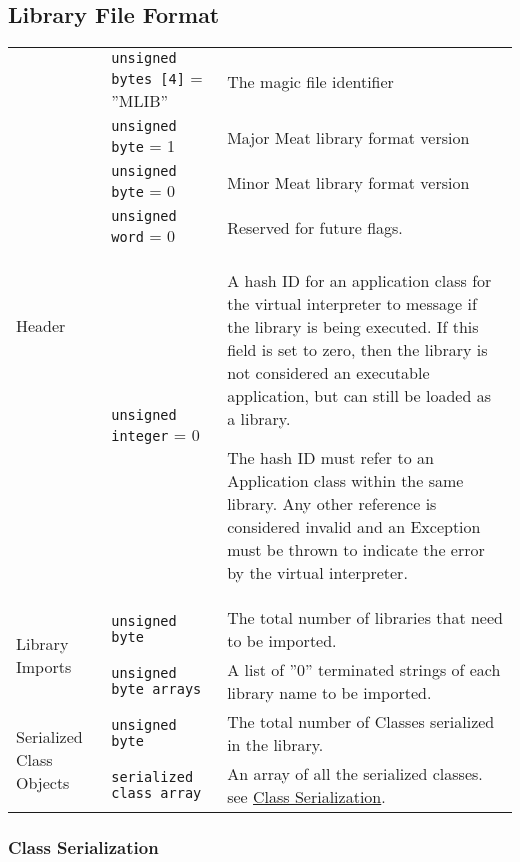 \subsection{Library File Format}

\begin{center}
  \begin{tabular}{ |l|l|p{8cm}| }
    \hline
    \multirow{5}{*}{Header} & \texttt{unsigned bytes [4]} = ''MLIB'' & The
    magic file identifier\\ \cline{2-3}
    & \texttt{unsigned byte} = 1 & Major Meat library format version\\
    \cline{2-3}
    & \texttt{unsigned byte} = 0 & Minor Meat library format version\\
    \cline{2-3}
    & \texttt{unsigned word} = 0 & Reserved for future flags.\\ \cline{2-3}
    & \texttt{unsigned integer} = 0 & A hash ID for an application class for
    the virtual interpreter to message if the library is being executed.
    If this field is set to zero, then the library is not considered an
    executable application, but can still be loaded as a library.

    The hash ID must refer to an Application class within the same library.
    Any other reference is considered invalid and an Exception must be
    thrown to indicate the error by the virtual interpreter.\\
    \hline

    \multirow{2}{*}{Library Imports} & \texttt{unsigned byte} & The total number of libraries that need to be imported.\\ \cline{2-3}
    & \texttt{unsigned byte arrays} & A list of ''0'' terminated strings of each library name to be imported.\\ \hline

    \multirow{2}{*}{Serialized Class Objects} & \texttt{unsigned byte} & The total number of Classes serialized in the library.\\ \cline{2-3}
    & \texttt{serialized class array} & An array of all the serialized classes. see \hyperref[sec:class_serial]{Class Serialization}.\\ \hline
  \end{tabular}
\end{center}

\subsubsection{Class Serialization}
\label{sec:class_serial}

